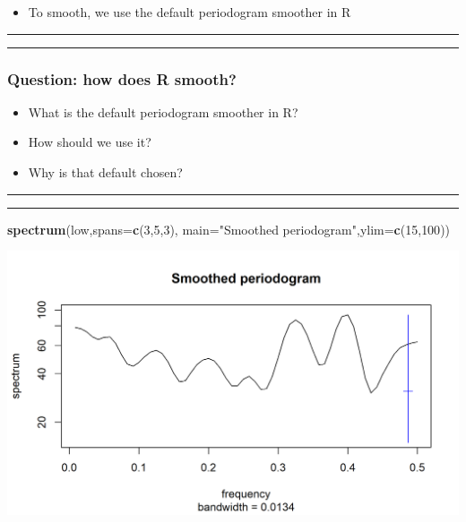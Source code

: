 \documentclass[]{article}
\newenvironment{Shaded}{\begin{snugshade}}{\end{snugshade}}
\newcommand{\KeywordTok}[1]{\textcolor[rgb]{0.13,0.29,0.53}{\textbf{#1}}}
\newcommand{\DataTypeTok}[1]{\textcolor[rgb]{0.13,0.29,0.53}{#1}}
\newcommand{\DecValTok}[1]{\textcolor[rgb]{0.00,0.00,0.81}{#1}}
\newcommand{\StringTok}[1]{\textcolor[rgb]{0.31,0.60,0.02}{#1}}
\newcommand{\NormalTok}[1]{#1}
\providecommand{\tightlist}{%
  \setlength{\itemsep}{0pt}\setlength{\parskip}{0pt}}
\begin{document}

\begin{itemize}
\tightlist
\item
  To smooth, we use the default periodogram smoother in R
\end{itemize}

\begin{center}\rule{0.5\linewidth}{\linethickness}\end{center}

\begin{center}\rule{0.5\linewidth}{\linethickness}\end{center}

\subsubsection{Question: how does R
smooth?}\label{question-how-does-r-smooth}

\begin{itemize}
\item
  What is the default periodogram smoother in R?
\item
  How should we use it?
\item
  Why is that default chosen?
\end{itemize}

\begin{center}\rule{0.5\linewidth}{\linethickness}\end{center}

\begin{center}\rule{0.5\linewidth}{\linethickness}\end{center}

\begin{Shaded}
\begin{Highlighting}[]
\KeywordTok{spectrum}\NormalTok{(low,}\DataTypeTok{spans=}\KeywordTok{c}\NormalTok{(}\DecValTok{3}\NormalTok{,}\DecValTok{5}\NormalTok{,}\DecValTok{3}\NormalTok{), }\DataTypeTok{main=}\StringTok{"Smoothed periodogram"}\NormalTok{,}\DataTypeTok{ylim=}\KeywordTok{c}\NormalTok{(}\DecValTok{15}\NormalTok{,}\DecValTok{100}\NormalTok{))}
\end{Highlighting}
\end{Shaded}

\begin{center}\includegraphics{figure/intro-smoothed_periodogram-1} \end{center}
\end{document}
